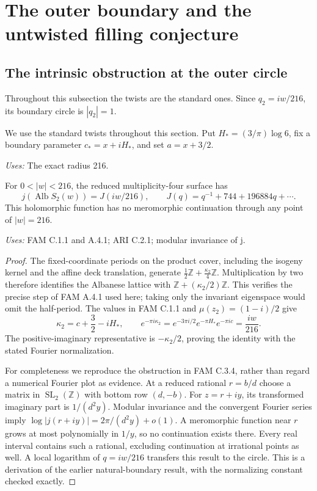 \section{The outer boundary and the untwisted filling conjecture}
\label{sec:ends}
\subsection{The intrinsic obstruction at the outer circle}
Throughout this subsection the twists are the standard ones.
Since $q_2=iw/216$, its boundary circle is $|q_2|=1$.
\begin{definition}\label{push:D.1.setup}
We use the standard twists throughout this section. Put
\(H_*=(3/\pi)\log6\), fix a boundary parameter
\(c_*=x+iH_*\), and set \(a=x+3/2\).
\end{definition}
\noindent\emph{Uses:} The exact radius 216.\par

\begin{proposition}[PUSH D.1.1; T]\label{push:D.1.1}
For \(0<|w|<216\), the reduced multiplicity-four surface has
\[
 j(\operatorname{Alb}S_2(w))=J(iw/216),\qquad
 J(q)=q^{-1}+744+196884q+\cdots.
\]
This holomorphic function has no meromorphic continuation through any
point of \(|w|=216\).
\end{proposition}
\noindent\emph{Uses:} FAM C.1.1 and A.4.1; ARI C.2.1; modular invariance of j.\par

\begin{proof}
The fixed-coordinate periods on the product cover, including the
isogeny kernel and the affine deck translation, generate
\(\frac12\mathbb Z+\frac{\kappa_2}{4}\mathbb Z\).
Multiplication by two therefore identifies the Albanese lattice with
\(\mathbb Z+(\kappa_2/2)\mathbb Z\). This verifies the precise step of
FAM A.4.1 used here; taking only the invariant eigenspace would omit the
half-period. The values in FAM C.1.1 and \(\mu(z_2)=(1-i)/2\) give
\[
 \kappa_2=c+\frac32-iH_*,\qquad
 e^{-\pi i\kappa_2}=e^{-3\pi i/2}e^{-\pi H_*}e^{-\pi ic}
 =\frac{iw}{216}.
\]
The positive-imaginary representative is \(-\kappa_2/2\), proving the
identity with the stated Fourier normalization.

For completeness we reproduce the obstruction in FAM C.3.4, rather than regard a numerical Fourier plot as evidence. At a
reduced rational \(r=b/d\) choose a matrix in
\(\operatorname{SL}_2(\mathbb Z)\) with bottom row \((d,-b)\).
For \(z=r+iy\), its transformed imaginary part is \(1/(d^2y)\).
Modular invariance and the convergent Fourier series imply
\(\log|j(r+iy)|=2\pi/(d^2y)+o(1)\).
A meromorphic function near \(r\) grows at most polynomially in
\(1/y\), so no continuation exists there. Every real interval contains
such a rational, excluding continuation at irrational points as well.
A local logarithm of \(q=iw/216\) transfers this result to the circle.
This is a derivation of the earlier natural-boundary result, with the
normalizing constant checked exactly.
\end{proof}

